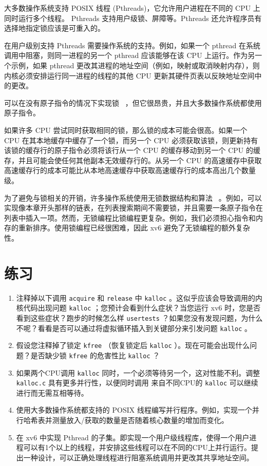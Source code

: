 \documentclass[UTF8]{article}
\begin{document}
大多数操作系统支持 POSIX 线程 (Pthreads)，它允许用户进程在不同的 CPU 上同时运行多个线程。 Pthreads 支持用户级锁、屏障等。Pthreads 还允许程序员有选择地指定锁应该是可重入的。  

在用户级别支持 Pthreads 需要操作系统的支持。例如，如果一个 pthread 在系统调用中阻塞，则同一进程的另一个 pthread 应该能够在该 CPU 上运行。作为另一个示例，如果 pthread 更改其进程的地址空间（例如，映射或取消映射内存），则内核必须安排运行同一进程的线程的其他 CPU 更新其硬件页表以反映地址空间中的更改。  

可以在没有原子指令的情况下实现锁~    \cite{lamport:bakery}    ，但它很昂贵，并且大多数操作系统都使用原子指令。  

如果许多 CPU 尝试同时获取相同的锁，那么锁的成本可能会很高。如果一个 CPU 在其本地缓存中缓存了一个锁，而另一个 CPU 必须获取该锁，则更新持有该锁的缓存行的原子指令必须将该行从一个 CPU 的缓存移动到另一个 CPU 的缓存，并且可能会使任何其他副本无效缓存行的。从另一个 CPU 的高速缓存中获取高速缓存行的成本可能比从本地高速缓存中获取高速缓存行的成本高出几个数量级。  

为了避免与锁相关的开销，许多操作系统使用无锁数据结构和算法~    \cite{herlihy:art,mckenney:rcuusage}    。例如，可以实现像本章开头那样的链表，在列表搜索期间不需要锁，并且需要一条原子指令在列表中插入一项。然而，无锁编程比锁编程更复杂。例如，我们必须担心指令和内存的重新排序。使用锁编程已经很困难，因此 xv6 避免了无锁编程的额外复杂性。
    \section{练习  }     

   \begin{enumerate}

 
   \item   注释掉以下调用
    \lstinline{acquire}    和
    \lstinline{release}    中
    \lstinline{kalloc}   
        。这似乎应该会导致调用的内核代码出现问题
    \lstinline{kalloc}    ；您预计会看到什么症状？当您运行 xv6 时，您是否看到这些症状？跑步的时候怎么样
    \lstinline{usertests}   ？如果您没有发现问题，为什么不呢？看看是否可以通过将虚拟循环插入到关键部分来引发问题
    \lstinline{kalloc}    。   \item   假设您注释掉了锁定
    \lstinline{kfree}   （恢复锁定后
    \lstinline{kalloc}   ）。现在可能会出现什么问题？是否缺少锁
    \lstinline{kfree}    的危害性比
    \lstinline{kalloc}   ？   \item   如果两个CPU调用
    \lstinline{kalloc}    同时，一个必须等待另一个，这对性能不利。调整
    \lstinline{kalloc.c}    具有更多并行性，以便同时调用
 来自不同CPU的   \lstinline{kalloc}   可以继续进行而无需互相等待。   \item   使用大多数操作系统都支持的 POSIX 线程编写并行程序。例如，实现一个并行哈希表并测量放入/获取的数量是否随着核心数量的增加而变化。   \item   在 xv6 中实现 Pthread 的子集。即实现一个用户级线程库，使得一个用户进程可以有1个以上的线程，并安排这些线程可以在不同的CPU上并行运行。提出一种设计，可以正确处理线程进行阻塞系统调用并更改其共享地址空间。  \end{enumerate}     
\end{document}
